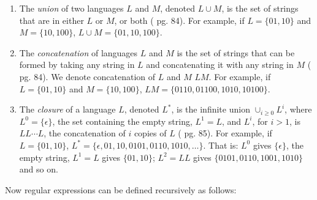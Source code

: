 \documentclass[a4paper,oneside,11pt]{book}
\theoremstyle{definition}
\begin{document}
\begin{enumerate}

\item
The \emph{union} of two languages $L$ and $M$, denoted $L \cup M$, is the set of strings that are in
either $L$ or $M$, or both (\cite{AUTOMATA} pg. 84).
For example, if $L = \{01, 10\}$ and $M = \{10, 100\}$, $L \cup M = \{01, 10, 100\}$.

\item
The \emph{concatenation} of languages $L$ and $M$ is the set of strings that can be formed by taking
any string in $L$ and concatenating it with any string in $M$ (\cite{AUTOMATA} pg. 84).
We denote concatenation of $L$ and $M$ $LM$.
For example, if $L = \{01, 10\}$ and $M = \{10, 100\}$, $LM = \{0110, 01100, 1010, 10100\}$.

\item
The \emph{closure} of a language $L$, denoted $L^*$, is the infinite union $\cup _{i\ge0}L^i$,
where $L^0 = \{\epsilon\}$, the set containing the empty string, $L^1 = L$, and
$L^i$, for $i > 1$, is $LL \cdots L$, the concatenation of $i$ copies of $L$ (\cite{AUTOMATA} pg. 85).
For example, if $L = \{01, 10\}$, $L^* = \{\epsilon, 01, 10, 0101, 0110, 1010, \ldots\}$.
That is: $L^0$ gives $\{\epsilon\}$, the empty string, $L^1 = L$ gives $\{01, 10\}$;
$L^2 = LL$ gives $\{0101, 0110, 1001, 1010\}$ and so on.

\end{enumerate}

Now regular expressions can be defined recursively as follows:
\end{document}
